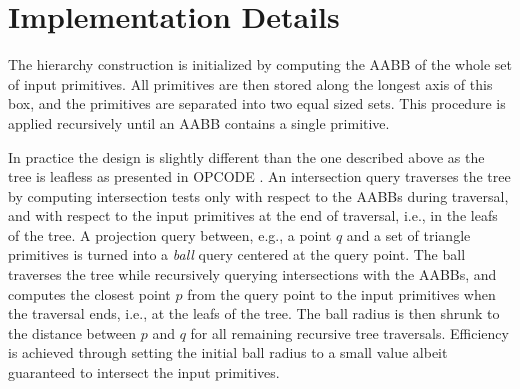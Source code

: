 \section{Implementation Details}
\label{AABB_tree_section_details}

The hierarchy construction is initialized by computing the AABB of the whole set of input primitives. All primitives are then stored along the longest axis of this box, and the primitives are separated into two equal sized sets. This procedure is applied recursively until an AABB contains a single primitive. 

In practice the design is slightly different than the one described above as the tree is leafless as presented in OPCODE \cite{cgal:t-ocdl-05}. An intersection query traverses the tree by computing intersection tests only with respect to the AABBs during traversal, and with respect to the input primitives at the end of traversal, i.e., in the leafs of the tree. A projection query between, e.g., a point $q$ and a set of triangle primitives is turned into a \emph{ball} query centered at the query point. The ball traverses the tree while recursively querying intersections with the AABBs, and computes the closest point $p$ from the query point to the input primitives when the traversal ends, i.e., at the leafs of the tree. The ball radius is then shrunk to the distance between $p$ and $q$ for all remaining recursive tree traversals. Efficiency is achieved through setting the initial ball radius to a small value albeit guaranteed to intersect the input primitives.